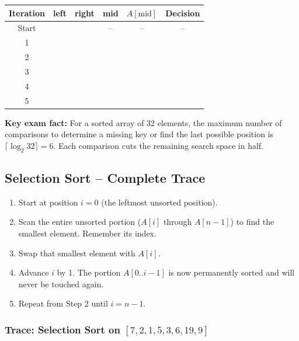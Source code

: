 \documentclass[12pt,portrait]{article}
\begin{document}
\begin{center}
\begin{tabular}{c|c|c|c|c|c}
\toprule
\textbf{Iteration} & \textbf{left} & \textbf{right} & \textbf{mid} & $A[\text{mid}]$ & \textbf{Decision} \\
\midrule
Start & & & -- & -- & -- \\
1 & & & & & \\
2 & & & & & \\
3 & & & & & \\
4 & & & & & \\
5 & & & & & \\
\bottomrule
\end{tabular}
\end{center}

\textbf{Key exam fact:} For a sorted array of 32 elements, the maximum number of comparisons to determine a missing key or find the last possible position is $\lceil\log_2 32\rceil = 6$. Each comparison cuts the remaining search space in half.

\subsection{Selection Sort -- Complete Trace}

\begin{rulebox}
\begin{enumerate}[leftmargin=*]
    \item Start at position $i=0$ (the leftmost unsorted position).
    \item Scan the entire unsorted portion ($A[i]$ through $A[n-1]$) to find the smallest element. Remember its index.
    \item Swap that smallest element with $A[i]$.
    \item Advance $i$ by 1. The portion $A[0..i-1]$ is now permanently sorted and will never be touched again.
    \item Repeat from Step 2 until $i = n-1$.
\end{enumerate}
\end{rulebox}

\subsubsection{Trace: Selection Sort on $[7,2,1,5,3,6,19,9]$}
\end{document}
